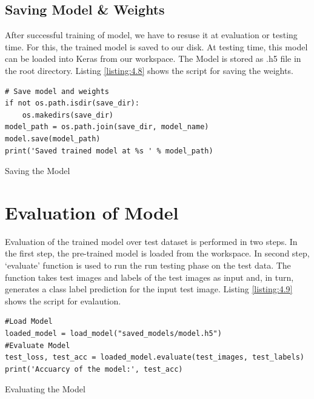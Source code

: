 \subsection{Saving Model \& Weights}
After successful training of model, we have to resuse it
at evaluation or testing time. For this, the trained model is saved to our disk.
At testing time, this model can be loaded into Keras 
from our workspace. The Model is stored as .h5 file in the root directory.
Listing \ref{listing:4.8} shows the script for saving the weights.

\begin{listing}[H]
    \begin{verbatim}
# Save model and weights
if not os.path.isdir(save_dir):
    os.makedirs(save_dir)
model_path = os.path.join(save_dir, model_name)
model.save(model_path)
print('Saved trained model at %s ' % model_path)
\end{verbatim}
\caption{Saving the Model}
\label{listing:4.8}
\end{listing}
\section{Evaluation of Model}
Evaluation of  the trained model over test dataset is  performed in two steps.
In the first step, the pre-trained model is loaded from the workspace.
In second step, `evaluate' function is used to run the run testing
phase on the test data. The function takes
test images and labels of the test images as input and, in turn,
generates a class label prediction for the input  test image. Listing \ref{listing:4.9} shows the script for
evalaution.
\begin{longlisting}
    \begin{verbatim}
#Load Model
loaded_model = load_model("saved_models/model.h5")
#Evaluate Model
test_loss, test_acc = loaded_model.evaluate(test_images, test_labels)
print('Accuarcy of the model:', test_acc)
\end{verbatim}
\caption{Evaluating the Model}
\label{listing:4.9}
\end{longlisting}
